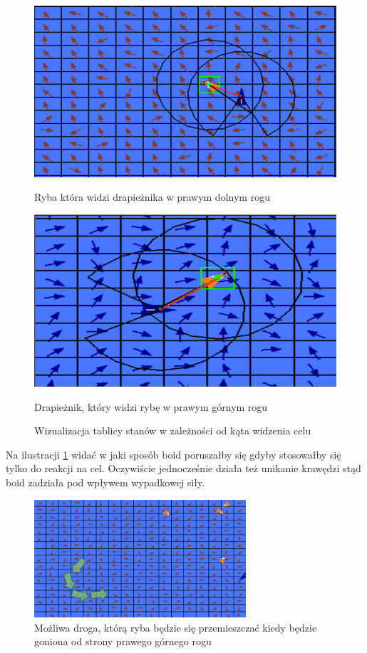 \documentclass{article}
\begin{document}
\begin{figure}[H]
    \begin{minipage}{0.48\textwidth}
        \centering
        \includegraphics[width=\textwidth]{fish_being_followed.png}
        \caption{Ryba która widzi drapieżnika w prawym dolnym rogu}
    \end{minipage}
    \hspace{0.02\textwidth}
    \begin{minipage}{0.48\textwidth}
        \centering
        \includegraphics[width=\textwidth]{hunting_predator.png}
        \caption{Drapieżnik, który widzi rybę w prawym górnym rogu}
    \end{minipage}
    \caption{Wizualizacja tablicy stanów w zależności od kąta widzenia celu}
    \label{fig:angle_to_objective}
\end{figure}
Na ilustracji \ref{fig:angle_to_objective} widać w jaki sposób boid poruszałby się gdyby stosowałby się tylko do reakcji na cel. Oczywiście jednocześnie działa też unikanie krawędzi stąd boid zadziała pod wpływem wypadkowej siły.
\begin{figure}[H]
    \centering
    \includegraphics[width=0.7\textwidth]{possible_track.png}
    \caption{Możliwa droga, którą ryba będzie się przemieszczać kiedy będzie goniona od strony prawego górnego rogu}
\end{figure}
\end{document}
